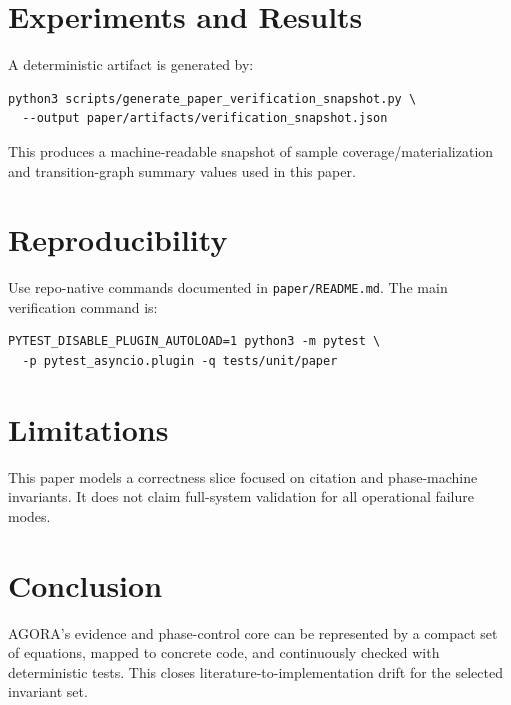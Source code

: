 \documentclass[11pt]{article}
\begin{document}
\section{Experiments and Results}\label{sec:results}
A deterministic artifact is generated by:
\begin{verbatim}
python3 scripts/generate_paper_verification_snapshot.py \
  --output paper/artifacts/verification_snapshot.json
\end{verbatim}
This produces a machine-readable snapshot of sample coverage/materialization and transition-graph summary values used in this paper.

\section{Reproducibility}\label{sec:reproducibility}
Use repo-native commands documented in \texttt{paper/README.md}. The main verification command is:
\begin{verbatim}
PYTEST_DISABLE_PLUGIN_AUTOLOAD=1 python3 -m pytest \
  -p pytest_asyncio.plugin -q tests/unit/paper
\end{verbatim}

\section{Limitations}
This paper models a correctness slice focused on citation and phase-machine invariants. It does not claim full-system validation for all operational failure modes.

\section{Conclusion}
AGORA's evidence and phase-control core can be represented by a compact set of equations, mapped to concrete code, and continuously checked with deterministic tests. This closes literature-to-implementation drift for the selected invariant set.



\end{document}
